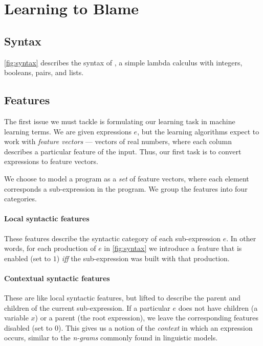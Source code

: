 \section{Learning to Blame}
\label{sec:learning}

\subsection{Syntax}
\label{sec:syntax}

%
\autoref{fig:syntax} describes the syntax of \lang, a simple lambda
calculus with integers, booleans, pairs, and lists.

\subsection{Features}
\label{sec:features}
The first issue we must tackle is formulating our learning task in
machine learning terms.
%
We are given expressions $e$, but the learning algorithms expect to work
with \emph{feature vectors} --- vectors of real numbers, where each
column describes a particular feature of the input.
%
Thus, our first task is to convert expressions to feature vectors.

We choose to model a program as a \emph{set} of feature vectors, where
each element corresponds a sub-expression in the program. We group the
features into four categories.

\paragraph{Local syntactic features}
These features describe the syntactic category of each sub-expression
$e$.
%
In other words, for each production of $e$ in \autoref{fig:syntax} we
introduce a feature that is enabled (set to $1$) \emph{iff} the
sub-expression was built with that production.

\paragraph{Contextual syntactic features}
These are like local syntactic features, but lifted to describe the
parent and children of the current sub-expression.
%
If a particular $e$ does not have children (\eg a variable $x$) or a
parent (\ie the root expression), we leave the corresponding features
disabled (set to $0$).
%
This gives us a notion of the \emph{context} in which an expression
occurs, similar to the \emph{n-grams} commonly found in linguistic
models.

